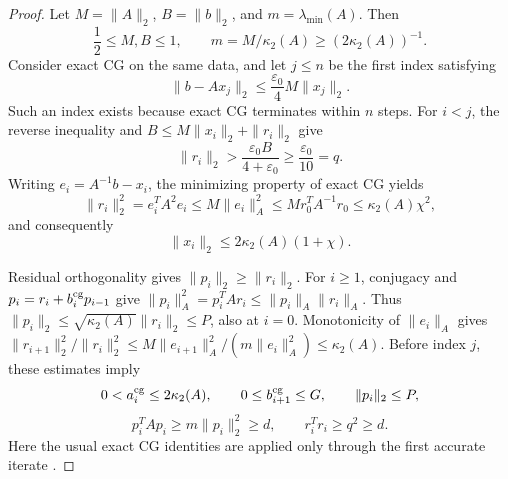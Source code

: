 \documentclass[11pt]{article}
\theoremstyle{definition}
\begin{document}
\begin{proof}
Let $M=\|A\|_2$, $B=\|b\|_2$, and $m=\lambda_{\min}(A)$.  Then
\begin{equation}
 \frac12\le M,B\le1,\qquad m=M/\kappa_2(A)\ge(2\kappa_2(A))^{-1}.
 \label{eq:scaled-basic}
\end{equation}
Consider exact CG on the same data, and let $j\le n$ be the first index
satisfying
\begin{equation}
 \|b-Ax_j\|_2\le\frac{\varepsilon_0}{4}M\|x_j\|_2.
 \label{eq:first-good-exact}
\end{equation}
Such an index exists because exact CG terminates within $n$ steps.
For $i<j$, the reverse inequality and
$B\le M\|x_i\|_2+\|r_i\|_2$ give
\begin{equation}
 \|r_i\|_2>\frac{\varepsilon_0B}{4+\varepsilon_0}
 \ge\frac{\varepsilon_0}{10}=q.
 \label{eq:residual-floor}
\end{equation}
Writing $e_i=A^{-1}b-x_i$, the minimizing property of exact CG yields
\begin{equation}
 \|r_i\|_2^2=e_i^TA^2e_i
 \le M\|e_i\|_A^2\le Mr_0^TA^{-1}r_0\le\kappa_2(A)\chi^2,
 \label{eq:exact-residual-ceiling}
\end{equation}
and consequently
\begin{equation}
 \|x_i\|_2\le2\kappa_2(A)(1+\chi).
 \label{eq:exact-x-ceiling}
\end{equation}

Residual orthogonality gives $\|p_i\|_2\ge\|r_i\|_2$.
For $i\ge1$, conjugacy and $p_i=r_i+b_i^{\rm cg}p_{i-1}$ give
$\|p_i\|_A^2=p_i^TAr_i\le\|p_i\|_A\|r_i\|_A$.
Thus $\|p_i\|_2\le\sqrt{\kappa_2(A)}\|r_i\|_2\le P$, also at $i=0$.
Monotonicity of $\|e_i\|_A$ gives
$\|r_{i+1}\|_2^2/\|r_i\|_2^2\le
M\|e_{i+1}\|_A^2/(m\|e_i\|_A^2)\le\kappa_2(A)$.
Before index $j$, these estimates imply
\begin{equation}
 0<a_i^{\rm cg}\le2\kappa_2(A),\qquad
 0\le b_{i+1}^{\rm cg}\le G,\qquad \|p_i\|_2\le P,
 \label{eq:coefficient-bounds}
\end{equation}
\begin{equation}
 p_i^TAp_i\ge m\|p_i\|_2^2\ge d,\qquad
 r_i^Tr_i\ge q^2\ge d.
 \label{eq:divisor-floor}
\end{equation}
Here the usual exact CG identities are applied only through the first
accurate iterate \cite[Secs.~6.7 and~6.11.3]{Saad2003}.


\end{proof}
\end{document}
